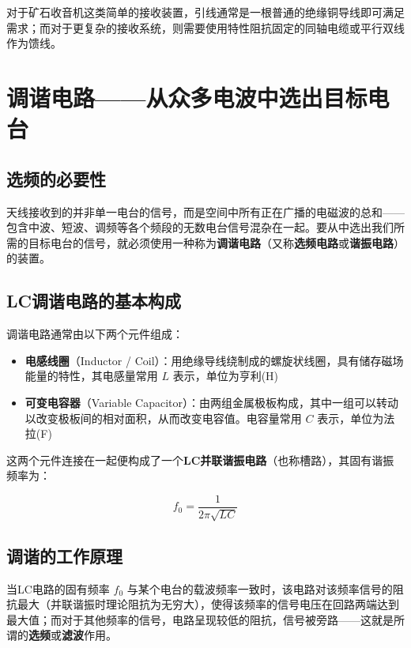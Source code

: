 \documentclass[12pt,UTF8]{ctexbook}
\begin{document}
对于矿石收音机这类简单的接收装置，引线通常是一根普通的绝缘铜导线即可满足需求；而对于更复杂的接收系统，则需要使用特性阻抗固定的同轴电缆或平行双线作为馈线。

\section{调谐电路——从众多电波中选出目标电台}

\subsection{选频的必要性}

天线接收到的并非单一电台的信号，而是空间中所有正在广播的电磁波的总和——包含中波、短波、调频等各个频段的无数电台信号混杂在一起。要从中选出我们所需的目标电台的信号，就必须使用一种称为\textbf{调谐电路}（又称\textbf{选频电路}或\textbf{谐振电路}）的装置。

\subsection{LC调谐电路的基本构成}

调谐电路通常由以下两个元件组成：

\begin{itemize}
	\item \textbf{电感线圈}（Inductor / Coil）：用绝缘导线绕制成的螺旋状线圈，具有储存磁场能量的特性，其电感量常用 $L$ 表示，单位为亨利(H)
	\item \textbf{可变电容器}（Variable Capacitor）：由两组金属极板构成，其中一组可以转动以改变极板间的相对面积，从而改变电容值。电容量常用 $C$ 表示，单位为法拉(F)
\end{itemize}

这两个元件连接在一起便构成了一个\textbf{LC并联谐振电路}（也称槽路），其固有谐振频率为：

\begin{equation}
	f_0 = \frac{1}{2\pi\sqrt{LC}}
\end{equation}

\subsection{调谐的工作原理}

当LC电路的固有频率 $f_0$ 与某个电台的载波频率一致时，该电路对该频率信号的阻抗最大（并联谐振时理论阻抗为无穷大），使得该频率的信号电压在回路两端达到最大值；而对于其他频率的信号，电路呈现较低的阻抗，信号被旁路——这就是所谓的\textbf{选频}或\textbf{滤波}作用。
\end{document}
